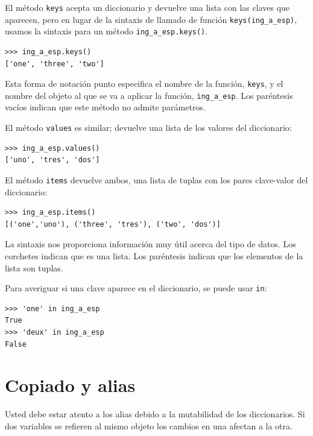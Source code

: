   
 

El método \texttt{keys} acepta un diccionario y devuelve una lista
con las claves que aparecen, pero en lugar de la sintaxis de llamado
de función \texttt{keys(ing\_a\_esp)}, usamos la sintaxis para un
método \texttt{ing\_a\_esp.keys()}.


\begin{verbatim}
>>> ing_a_esp.keys()
['one', 'three', 'two']
\end{verbatim}
 Esta forma de notación punto especifica el nombre de la función,
\texttt{keys}, y el nombre del objeto al que se va a aplicar la función,
\texttt{ing\_a\_esp}. Los paréntesis vacíos indican que este método
no admite parámetros.

El método \texttt{values} es similar; devuelve una lista de los valores
del diccionario:
\begin{verbatim}
>>> ing_a_esp.values()
['uno', 'tres', 'dos']
\end{verbatim}

El método \texttt{items} devuelve ambos, una lista de tuplas con los
pares clave-valor del diccionario:
\begin{verbatim}
>>> ing_a_esp.items()
[('one','uno'), ('three', 'tres'), ('two', 'dos')]
\end{verbatim}

La sintaxis nos proporciona información muy útil acerca del tipo de
datos. Los corchetes indican que es una lista. Los paréntesis indican
que los elementos de la lista son tuplas.

Para averiguar si una clave aparece en el diccionario, se puede usar
\texttt{in}:
\begin{verbatim}
>>> 'one' in ing_a_esp
True
>>> 'deux' in ing_a_esp
False
\end{verbatim}


\section{Copiado y alias}

  

Usted debe estar atento a los alias debido a la mutabilidad de los
diccionarios. Si dos variables se refieren al mismo objeto los cambios
en una afectan a la otra.

